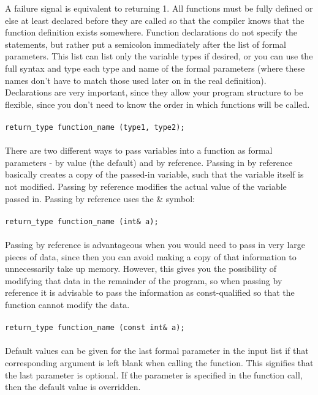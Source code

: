 \documentclass[10pt]{article}
\begin{document}
\begin{flushleft}
A failure signal is equivalent to returning 1. All functions must be fully defined or else at least declared before they are called so that the compiler knows that the function definition exists somewhere. Function declarations do not specify the statements, but rather put a semicolon immediately after the list of formal parameters. This list can list only the variable types if desired, or you can use the full syntax and type each type and name of the formal parameters (where these names don't have to match those used later on in the real definition). Declarations are very important, since they allow your program structure to be flexible, since you don't need to know the order in which functions will be called.\\
\\
\color{red}\texttt{return\_type function\_name (type1, type2);}\color{black}\\
\\
There are two different ways to pass variables into a function as formal parameters - by value (the default) and by reference. Passing in by reference basically creates a copy of the passed-in variable, such that the variable itself is not modified. Passing by reference modifies the actual value of the variable passed in. Passing by reference uses the \& symbol:\\
\\
\color{red}\texttt{return\_type function\_name (int\& a);}\color{black}\\
\\
Passing by reference is advantageous when you would need to pass in very large pieces of data, since then you can avoid making a copy of that information to unnecessarily take up memory. However, this gives you the possibility of modifying that data in the remainder of the program, so when passing by reference it is advisable to pass the information as const-qualified so that the function cannot modify the data.\\
\\
\color{red}\texttt{return\_type function\_name (const int\& a);}\color{black}\\
\\
Default values can be given for the last formal parameter in the input list if that corresponding argument is left blank when calling the function. This signifies that the last parameter is optional. If the parameter is specified in the function call, then the default value is overridden.\\
\\

\end{flushleft}
\end{document}
